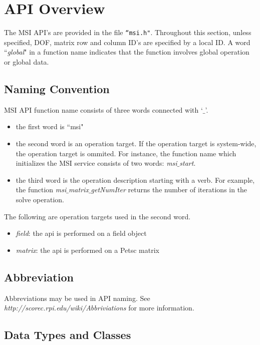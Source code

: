\section{API Overview}
The MSI API's are provided in the file \texttt{``msi.h"}. Throughout this section, unless specified, DOF, matrix row and column ID's are specified by a local ID. A word ``\emph{global}" in a function name indicates that the function involves global operation or global data.

\subsection{Naming Convention}

MSI API function name consists of three words connected with `$\_$'.

\begin{itemize}
\item the first word is ``msi"
\item the second word is an operation target. If the operation target is system-wide, the operation target is ommited. For instance, the function name which initializes the MSI service consists of two words: \emph{msi}$\_$\emph{start}.
\item the third word is the operation description starting with a verb. For example, the function \emph{msi}$\_$\emph{matrix}$\_$\emph{getNumIter} returns the number of iterations in the solve operation. 
\end{itemize}

The following are operation targets used in the second word.

\begin{itemize}
\item \textit{field}: the api is performed on a field object
\item \textit{matrix}: the api is performed on a Petsc matrix
\end{itemize}

\subsection{Abbreviation}

Abbreviations may be used in API naming. See \textit{http://scorec.rpi.edu/wiki/Abbriviations} for more information.
 
\subsection{Data Types and Classes}


